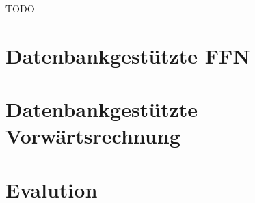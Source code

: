 \begin{bsp}
    \label{bsp:Kzeropad}
    TODO
\end{bsp}


\section{Datenbankgestützte FFN}
\label{abs:FFN_in_sql}
\section{Datenbankgestützte Vorwärtsrechnung}
\label{abs_CNN_in_SQL}
\section{Evalution}
\label{abs:CNN_eval}